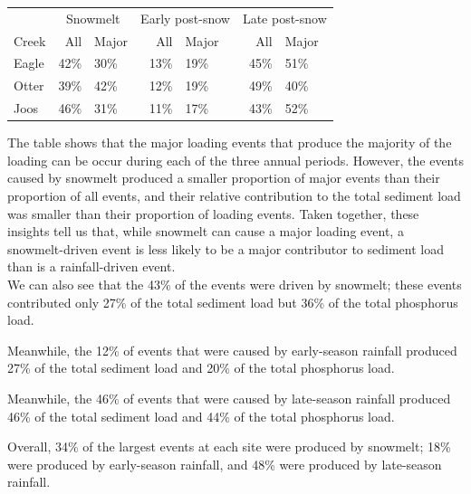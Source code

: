 \documentclass[12pt]{article}
\begin{document}
\begin{table}[h]
    \begin{center}
    \begin{tabular}{lr|lr|lr|l}
        & \multicolumn{2}{c}{Snowmelt    }\ & \multicolumn{2}{c}{Early post-snow}\ & \multicolumn{2}{c}{Late post-snow} \\
        Creek & All & Major & All & Major & All & Major \\
        \hline 
        Eagle & 42\% & 30\% & 13\% & 19\% & 45\% & 51\% \\
        Otter & 39\% & 42\% & 12\% & 19\% & 49\% & 40\% \\
        Joos & 46\% & 31\% & 11\% & 17\% & 43\% & 52\% \\
        
    \end{tabular}
    \end{center}
\end{table}



The table shows that the major loading events that produce the majority of the loading can be occur during each of the three annual periods. However, the events caused by snowmelt produced a smaller proportion of major events than their proportion of all events, and their relative contribution to the total sediment load was smaller than their proportion of loading events. Taken together, these insights tell us that, while snowmelt can cause a major loading event, a snowmelt-driven event is less likely to be a major contributor to sediment load than is a rainfall-driven event.\\

We can also see that the 43\% of the events were driven by snowmelt; these events contributed only 27\% of the total sediment load but 36\% of the total phosphorus load.

Meanwhile, the 12\% of events that were caused by early-season rainfall produced 27\% of the total sediment load and 20\% of the total phosphorus load.

Meanwhile, the 46\% of events that were caused by late-season rainfall produced 46\% of the total sediment load and 44\% of the total phosphorus load.


Overall, 34\% of the largest events at each site were produced by snowmelt; 18\% were produced by early-season rainfall, and 48\% were produced by late-season rainfall.
\end{document}
